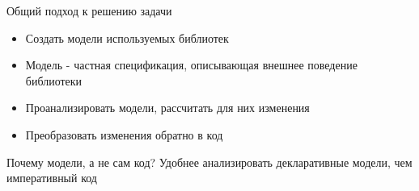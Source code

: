 \documentclass[12pt]{beamer}
\begin{document}
{
\begin{frame}{Общий подход к решению задачи}
\begin{mybox}[]
\begin{itemize}
	\item Создать модели используемых библиотек
	\item Модель - частная спецификация, описывающая внешнее поведение библиотеки
	\item Проанализировать модели, рассчитать для них изменения
	\item Преобразовать изменения обратно в код
\end{itemize}
\end{mybox}

\begin{alertblock}{Почему модели, а не сам код?}
Удобнее анализировать декларативные модели, чем императивный код
\end{alertblock}
\end{frame}
}
\end{document}
